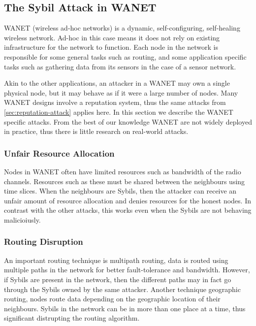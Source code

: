 \subsection{The Sybil Attack in WANET}
WANET (wireless ad-hoc networks) is a dynamic, self-configuring, self-healing
wireless network. Ad-hoc in this case means it does not rely on existing
infrastructure for the network to function. Each node in the network is
responsible for some general tasks such as routing, and some application
specific tasks such as gathering data from its sensors in the case of a sensor
network.

Akin to the other applications, an attacker in a WANET may own a single physical
node, but it may behave as if it were a large number of nodes. Many WANET
designs involve a reputation system\cite{ganeriwal2008reputation,
  buchegger2003robust}, thus the same attacks from
\autoref{sec:reputation-attack} applies here.
In this section we describe the WANET specific attacks. 
From the best of our knowledge WANET are not widely deployed in practice,
thus there is little research on real-world attacks.

\subsubsection{Unfair Resource Allocation}
Nodes in WANET often have limited resources such as bandwidth of the radio
channels. Resources such as these must be shared between the neighbours using
time slices. When the neighbours are Sybils, then the attacker can receive an
unfair amount of resource allocation and denies resources for the honest
nodes\cite{newsome2004sybil}. In contrast with the other attacks, this works
even when the Sybils are not behaving malicioiusly.

\subsubsection{Routing Disruption}
An important routing technique is multipath routing, data is routed using
multiple paths in the network for better fault-tolerance and bandwidth. However,
if Sybils are present in the network, then the different paths may in fact go
through the Sybils owned by the same attacker. Another technique geographic
routing, nodes route data depending on the geographic location of their
neighbours. Sybils in the network can be in more than one place at a time, thus
significant distrupting the routing algorithm\cite{karlof2003secure}.

